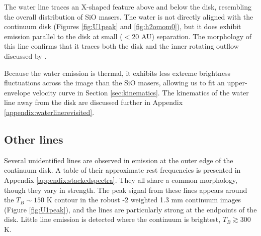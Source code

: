 \documentclass[twocolumn]{aastex61}
\begin{document}
The water line traces an X-shaped feature above and below the disk, resembling
the overall distribution of SiO masers.  The water is not directly aligned with
the continuum disk (Figures \ref{fig:U1peak} and \ref{fig:h2omom0}), but it
does exhibit emission parallel to the disk at small ($<20$ AU) separation.  
The morphology of this line confirms that it traces both the disk and
the inner rotating outflow discussed by \citet{Hirota2017b} \citep[see
also][]{Kim2008a,Matthews2010a}.


Because the water emission is thermal, it exhibits less extreme
brightness fluctuations across the image than the SiO masers, allowing us to
fit an upper-envelope velocity curve in Section \ref{sec:kinematics}.
The kinematics of the water line away from the disk are discussed
further in Appendix \ref{appendix:waterlinerevisited}.



\subsection{Other lines}
\label{sec:otherlines}
Several unidentified lines are observed in  emission at the outer edge of the
continuum disk.  A table of their approximate rest frequencies is presented
in Appendix \ref{appendix:stackedspectra}.  They all share a common morphology,
though they vary in strength.  The peak signal from these lines appears around
the $T_B\sim150$ K contour in the robust -2 weighted 1.3 mm continuum images
(Figure \ref{fig:U1peak}), and the lines are particularly strong at the
endpoints of the disk.  Little line emission is detected where the continuum is
brightest, $T_B\gtrsim300$ K.
\end{document}
